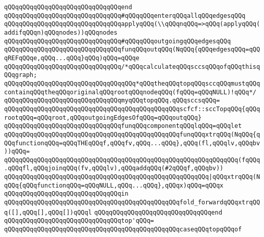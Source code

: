 \verb|qQQqqQQqqQQqqQQqqQQqqQQqqQQqqQQqend|\newline
\verb|qQQqqQQqqQQqqQQqqQQqqQQqqQQqqQQq#qQQqqQQqenterqQQqallqQQqedgesqQQq|\newline
\verb|qQQqqQQqqQQqqQQqqQQqqQQqqQQqqQQqapplyqQQq(\\qQQqnqQQq=>qQQq(applyqQQq(addifqQQqn)qQQqnodes))qQQqnodes|\newline
\verb|qQQqqQQqqQQqqQQqqQQqqQQqqQQqqQQq#qQQqqQQqoutgoingqQQqedgesqQQq|\newline
\verb|qQQqqQQqqQQqqQQqqQQqqQQqqQQqqQQqfunqQQqoutqQQq(NqQQq{qQQqedgesqQQq=qQQqREFqQQqe,qQQq...qQQq}qQQq)qQQq=qQQqe|\newline
\verb|qQQqqQQqqQQqqQQqqQQqqQQqqQQqqQQq/*qQQqcalculateqQQqsccsqQQqofqQQqthisqQQqgraph;|\newline
\verb|qQQqqQQqqQQqqQQqqQQqqQQqqQQqqQQqqQQq*qQQqtheqQQqtopqQQqsccqQQqmustqQQqcontainqQQqtheqQQqoriginalqQQqrootqQQqnodeqQQq(fqQQq=qQQqNULL)!qQQq*/|\newline
\verb|qQQqqQQqqQQqqQQqqQQqqQQqqQQqqQQqmyqQQqtopqQQq.qQQqsccsqQQq=|\newline
\verb|qQQqqQQqqQQqqQQqqQQqqQQqqQQqqQQqqQQqqQQqqQQqqQQqscfcf::sccTopqQQq{qQQqrootqQQq=qQQqroot,qQQqoutgoingEdgesOfqQQq=qQQqoutqQQq}|\newline
\newline
\verb|qQQqqQQqqQQqqQQqqQQqqQQqqQQqqQQqfunqQQqcomponentqQQqlqQQq=qQQqlet|\newline
\verb|qQQqqQQqqQQqqQQqqQQqqQQqqQQqqQQqqQQqqQQqqQQqqQQqfunqQQqxtrqQQq(NqQQq{qQQqfunctionqQQq=qQQqTHEqQQqf,qQQqfv,qQQq...qQQq},qQQq(fl,qQQqlv,qQQqbv))qQQq=|\newline
\verb|qQQqqQQqqQQqqQQqqQQqqQQqqQQqqQQqqQQqqQQqqQQqqQQqqQQqqQQqqQQqqQQq(fqQQq.qQQqfl,qQQqjoinqQQq(fv,qQQqlv),qQQqaddqQQq(#2qQQqf,qQQqbv))|\newline
\verb|qQQqqQQqqQQqqQQqqQQqqQQqqQQqqQQqqQQqqQQqqQQqqQQqqQQqqQQq|\verb#|qQQqxtrqQQq(NqQQq{qQQqfunctionqQQq=qQQqNULL,qQQq...qQQq},qQQqx)qQQq=qQQqx#\newline
\verb|qQQqqQQqqQQqqQQqqQQqqQQqqQQqqQQqin|\newline
\verb|qQQqqQQqqQQqqQQqqQQqqQQqqQQqqQQqqQQqqQQqqQQqqQQqfold_forwardqQQqxtrqQQq([],qQQq[],qQQq[])qQQql|\newline
\verb|qQQqqQQqqQQqqQQqqQQqqQQqqQQqqQQqend|\newline
\newline
\verb|qQQqqQQqqQQqqQQqqQQqqQQqqQQqqQQqtop'qQQq=|\newline
\verb|qQQqqQQqqQQqqQQqqQQqqQQqqQQqqQQqqQQqqQQqqQQqqQQqcaseqQQqtopqQQqof|\newline
